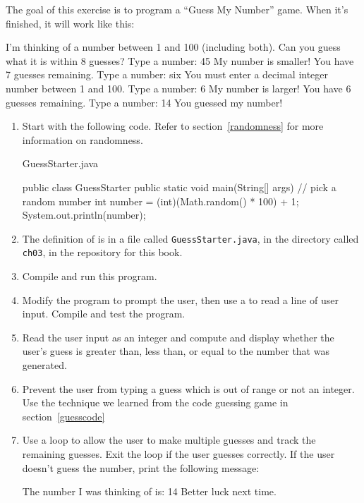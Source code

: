 \begin{exercise}  %
\label{guess}

The goal of this exercise is to program a ``Guess My Number'' game.
When it's finished, it will work like this:

\begin{stdout}
I'm thinking of a number between 1 and 100
(including both). Can you guess what it is within 8 guesses?
Type a number: 45
My number is smaller!
You have 7 guesses remaining.
Type a number: six
You must enter a decimal integer number between 1 and 100.
Type a number: 6
My number is larger!
You have 6 guesses remaining.
Type a number: 14
You guessed my number!
\end{stdout}


\begin{enumerate}

\item Start with the following code. Refer to section~\ref{randomness} for more information on randomness.

\label{guessstarter}

\begin{trinket}{GuessStarter.java}
	
	public class GuessStarter {		
		public static void main(String[] args) {
			// pick a random number
			int number = (int)(Math.random() * 100) + 1;
			System.out.println(number);
		}
	}
\end{trinket}


\item The definition of  is in a file called {\tt GuessStarter.java}, in the directory called {\tt ch03}, in the repository for this book.

\item Compile and run this program.

\item Modify the program to prompt the user, then use a  to read a line of user input.
Compile and test the program.

\item Read the user input as an integer and compute and display whether the user's guess is greater than, less than, or equal to the number that was generated.

\item Prevent the user from typing a guess which is out of range or not an integer. Use the technique we learned from the code guessing game in section~\ref{guesscode}

\item Use a loop to allow the user to make multiple guesses and track the remaining guesses. Exit the loop if the user guesses correctly. If the user doesn't guess the number, print the following message:
\begin{stdout}
The number I was thinking of is: 14
Better luck next time.	
\end{stdout}


\end{enumerate}

\end{exercise}

